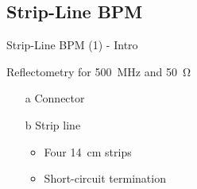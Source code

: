 \documentclass{beamer}
\begin{document}
\subsection{Strip-Line BPM}
\begin{frame}[t,fragile]{Strip-Line BPM (1) - Intro}

Reflectometry for \SI{500}{\MHz} and \SI{50}{\ohm}
\begin{itemize}
\item[a] Connector
\item[b] Strip line
\begin{itemize}
\item Four \SI{14}{\cm} strips
\item Short-circuit termination
\end{itemize}
\end{itemize}

\begin{figure}
  \centering
  \quad
\end{figure}

\end{frame}
\end{document}

